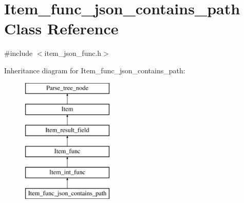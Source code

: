 \hypertarget{classItem__func__json__contains__path}{}\section{Item\+\_\+func\+\_\+json\+\_\+contains\+\_\+path Class Reference}
\label{classItem__func__json__contains__path}


{\ttfamily \#include $<$item\+\_\+json\+\_\+func.\+h$>$}

Inheritance diagram for Item\+\_\+func\+\_\+json\+\_\+contains\+\_\+path\+:\begin{figure}[H]
\begin{center}
\leavevmode
\includegraphics[height=6.000000cm]{classItem__func__json__contains__path}
\end{center}
\end{figure}
